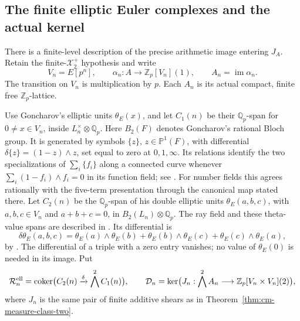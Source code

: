 \documentclass[11pt]{article}
\theoremstyle{definition}\newtheorem{definition}[theorem]{Definition}
\begin{document}
\subsection{The finite elliptic Euler complexes and the actual kernel}
\label{subsec:cm-elliptic-euler-kernel}

There is a finite-level description of the precise arithmetic
image entering \(J_A\).  Retain the finite-\(\mathcal X_2^+\)
hypothesis and write
\[
 V_n=E[p^n],\qquad
 \alpha_n:A\longrightarrow\mathbb Z_p[V_n](1),\qquad
 A_n=\operatorname{im}\alpha_n.
\]
The transition on \(V_n\) is multiplication by \(p\).
Each \(A_n\) is its actual compact, finite free
\(\mathbb Z_p\)-lattice.

Use Goncharov's elliptic units \(\theta_E(x)\), and let
\(C_1(n)\) be their \(\mathbb Q_p\)-span for
\(0\ne x\in V_n\), inside \(L_n^\times\otimes\mathbb Q_p\).
Here \(B_2(F)\) denotes Goncharov's rational Bloch group.
It is generated by symbols \(\{z\}\), \(z\in\mathbb P^1(F)\),
with differential \(\delta\{z\}=(1-z)\wedge z\), set equal to
zero at \(0,1,\infty\). Its relations identify the two
specializations of \(\sum_i\{f_i\}\) along a connected curve
whenever \(\sum_i(1-f_i)\wedge f_i=0\) in its function field;
see \cite[Section 2.1, p.~10]{GoncharovEuler}.
For number fields this agrees rationally with the five-term
presentation through the canonical map stated there.
Let \(C_2(n)\) be the \(\mathbb Q_p\)-span of his
double elliptic units \(\theta_E(a,b,c)\), with
\(a,b,c\in V_n\) and \(a+b+c=0\), in
\(B_2(L_n)\otimes\mathbb Q_p\).
The ray field and these theta-value spans are described in
\cite[Definition 5.2, Proposition 5.3 and Definition 5.4,
p.~27]{GoncharovEuler}.
Its differential is
\begin{equation}\label{eq:cm-elliptic-triangle-delta}
 \delta\theta_E(a,b,c)
   =\theta_E(a)\wedge\theta_E(b)
    +\theta_E(b)\wedge\theta_E(c)
    +\theta_E(c)\wedge\theta_E(a),
\end{equation}
by \cite[Theorem 2.10(a), equation (38), p.~15]{GoncharovEuler}.
The differential of a triple with a zero entry vanishes;
no value of \(\theta_E(0)\) is needed in its image.
Put
\[
 \mathcal R_n^{\rm ell}
   =\operatorname{coker}\bigl(C_2(n)
                          \xrightarrow{\delta}\bigwedge^2C_1(n)\bigr),
 \qquad
 \mathcal D_n=\ker\bigl(J_n:\bigwedge^2A_n
                   \longrightarrow\mathbb Z_p[V_n\times V_n](2)\bigr),
\]
where \(J_n\) is the same pair of finite additive shears
as in Theorem~\ref{thm:cm-measure-class-two}.
\end{document}
